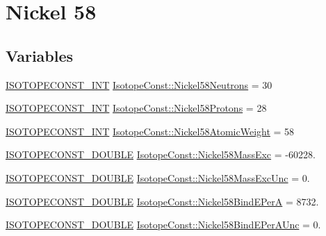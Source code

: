 \hypertarget{group___isotope_const-_nickel-_ni58}{}\section{Nickel 58}
\label{group___isotope_const-_nickel-_ni58}
\subsection*{Variables}
\begin{DoxyCompactItemize}
\item 
\mbox{\hyperlink{group___isotope_const-_macros_ga5f18360b3e99483a35c32d789e62621c}{I\+S\+O\+T\+O\+P\+E\+C\+O\+N\+S\+T\+\_\+\+I\+NT}} \mbox{\hyperlink{group___isotope_const-_nickel-_ni58_gae79fad7167a48b3796d605c1827bdd97}{Isotope\+Const\+::\+Nickel58\+Neutrons}} = 30
\item 
\mbox{\hyperlink{group___isotope_const-_macros_ga5f18360b3e99483a35c32d789e62621c}{I\+S\+O\+T\+O\+P\+E\+C\+O\+N\+S\+T\+\_\+\+I\+NT}} \mbox{\hyperlink{group___isotope_const-_nickel-_ni58_ga884e7f4aac7f5bf6746eaee0f7caeaaa}{Isotope\+Const\+::\+Nickel58\+Protons}} = 28
\item 
\mbox{\hyperlink{group___isotope_const-_macros_ga5f18360b3e99483a35c32d789e62621c}{I\+S\+O\+T\+O\+P\+E\+C\+O\+N\+S\+T\+\_\+\+I\+NT}} \mbox{\hyperlink{group___isotope_const-_nickel-_ni58_ga1da5ab30c23b7f68a1bc71167bc5dde2}{Isotope\+Const\+::\+Nickel58\+Atomic\+Weight}} = 58
\item 
\mbox{\hyperlink{group___isotope_const-_macros_ga8f45a7272ce02c0b4c65c44636ed719a}{I\+S\+O\+T\+O\+P\+E\+C\+O\+N\+S\+T\+\_\+\+D\+O\+U\+B\+LE}} \mbox{\hyperlink{group___isotope_const-_nickel-_ni58_ga55e05b3b0e57a32e3518ed9d4d3bdb70}{Isotope\+Const\+::\+Nickel58\+Mass\+Exc}} = -\/60228.
\item 
\mbox{\hyperlink{group___isotope_const-_macros_ga8f45a7272ce02c0b4c65c44636ed719a}{I\+S\+O\+T\+O\+P\+E\+C\+O\+N\+S\+T\+\_\+\+D\+O\+U\+B\+LE}} \mbox{\hyperlink{group___isotope_const-_nickel-_ni58_ga453003738a81f852db23d91396327bd7}{Isotope\+Const\+::\+Nickel58\+Mass\+Exc\+Unc}} = 0.
\item 
\mbox{\hyperlink{group___isotope_const-_macros_ga8f45a7272ce02c0b4c65c44636ed719a}{I\+S\+O\+T\+O\+P\+E\+C\+O\+N\+S\+T\+\_\+\+D\+O\+U\+B\+LE}} \mbox{\hyperlink{group___isotope_const-_nickel-_ni58_ga83b695c22703a64d71ffabe07848b108}{Isotope\+Const\+::\+Nickel58\+Bind\+E\+PerA}} = 8732.
\item 
\mbox{\hyperlink{group___isotope_const-_macros_ga8f45a7272ce02c0b4c65c44636ed719a}{I\+S\+O\+T\+O\+P\+E\+C\+O\+N\+S\+T\+\_\+\+D\+O\+U\+B\+LE}} \mbox{\hyperlink{group___isotope_const-_nickel-_ni58_gac84a5c0fa93cfa9afefc6a1526ada0c0}{Isotope\+Const\+::\+Nickel58\+Bind\+E\+Per\+A\+Unc}} = 0.

\end{DoxyCompactItemize}
